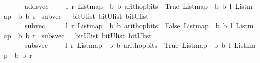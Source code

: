 \begin{isabellebody}
\ \ \ \ \ {\isachardoublequoteopen}\ adds{\isacharunderscore}vec\ \ {\isacharequal}\ {\isacharparenleft}\ {\isacharparenleft}{\isasymlambda}\ l\ r{\isachardot}\ List{\isachardot}map\ {\isacharparenleft}{\isasymlambda}\ b{\isachardot}\ b{\isacharparenright}\ {\isacharparenleft}arith{\isacharunderscore}op{\isacharunderscore}bits\ {\isacharparenleft}{\isacharplus}{\isacharparenright}\ True\ {\isacharparenleft}List{\isachardot}map\ {\isacharparenleft}{\isasymlambda}\ b{\isachardot}\ b{\isacharparenright}\ l{\isacharparenright}\ {\isacharparenleft}List{\isachardot}map\ {\isacharparenleft}{\isasymlambda}\ b{\isachardot}\ b{\isacharparenright}\ r{\isacharparenright}{\isacharparenright}{\isacharparenright}{\isacharparenright}{\isachardoublequoteclose}\isanewline
\isanewline
{}\isamarkupfalse%
\ sub{\isacharunderscore}vec\ \ {\isacharcolon}{\isacharcolon}\ {\isachardoublequoteopen}{\isacharparenleft}bitU{\isacharparenright}list\ {\isasymRightarrow}{\isacharparenleft}bitU{\isacharparenright}list\ {\isasymRightarrow}{\isacharparenleft}bitU{\isacharparenright}list\ {\isachardoublequoteclose}\ \ \ \ \ \isanewline
\ \ \ \ \ {\isachardoublequoteopen}\ sub{\isacharunderscore}vec\ \ \ {\isacharequal}\ {\isacharparenleft}\ {\isacharparenleft}{\isasymlambda}\ l\ r{\isachardot}\ List{\isachardot}map\ {\isacharparenleft}{\isasymlambda}\ b{\isachardot}\ b{\isacharparenright}\ {\isacharparenleft}arith{\isacharunderscore}op{\isacharunderscore}bits\ {\isacharparenleft}{\isacharminus}{\isacharparenright}\ False\ {\isacharparenleft}List{\isachardot}map\ {\isacharparenleft}{\isasymlambda}\ b{\isachardot}\ b{\isacharparenright}\ l{\isacharparenright}\ {\isacharparenleft}List{\isachardot}map\ {\isacharparenleft}{\isasymlambda}\ b{\isachardot}\ b{\isacharparenright}\ r{\isacharparenright}{\isacharparenright}{\isacharparenright}{\isacharparenright}{\isachardoublequoteclose}\isanewline
\isanewline
{}\isamarkupfalse%
\ subs{\isacharunderscore}vec\ \ {\isacharcolon}{\isacharcolon}\ {\isachardoublequoteopen}{\isacharparenleft}bitU{\isacharparenright}list\ {\isasymRightarrow}{\isacharparenleft}bitU{\isacharparenright}list\ {\isasymRightarrow}{\isacharparenleft}bitU{\isacharparenright}list\ {\isachardoublequoteclose}\ \ \ \ \isanewline
\ \ \ \ \ {\isachardoublequoteopen}\ subs{\isacharunderscore}vec\ \ {\isacharequal}\ {\isacharparenleft}\ {\isacharparenleft}{\isasymlambda}\ l\ r{\isachardot}\ List{\isachardot}map\ {\isacharparenleft}{\isasymlambda}\ b{\isachardot}\ b{\isacharparenright}\ {\isacharparenleft}arith{\isacharunderscore}op{\isacharunderscore}bits\ {\isacharparenleft}{\isacharminus}{\isacharparenright}\ True\ {\isacharparenleft}List{\isachardot}map\ {\isacharparenleft}{\isasymlambda}\ b{\isachardot}\ b{\isacharparenright}\ l{\isacharparenright}\ {\isacharparenleft}List{\isachardot}map\ {\isacharparenleft}{\isasymlambda}\ b{\isachardot}\ b{\isacharparenright}\ r{\isacharparenright}{\isacharparenright}{\isacharparenright}{\isacharparenright}{\isachardoublequoteclose}\isanewline

\end{isabellebody}
